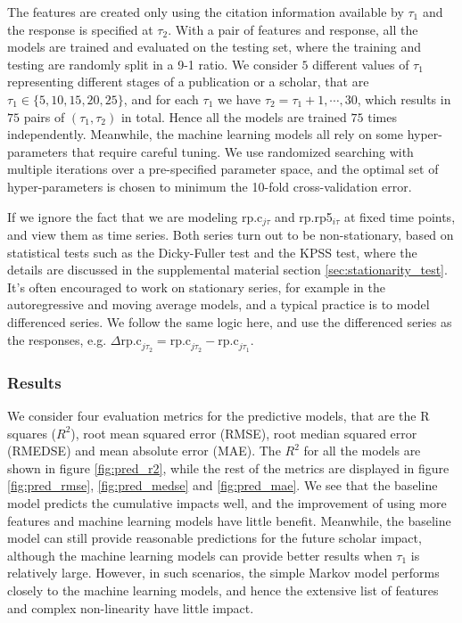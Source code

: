 The features are created only using the citation information available by $\tau_1$ and the response is specified at $\tau_2$. With a pair of features and response, all the models are trained and evaluated on the testing set, where the training and testing are randomly split in a 9-1 ratio. We consider $5$ different values of $\tau_1$ representing different stages of a publication or a scholar, that are $\tau_1\in\{5,10,15,20,25\}$, and for each $\tau_1$ we have $\tau_2=\tau_1+1,\cdots,30$, which results in $75$ pairs of $(\tau_1,\tau_2)$ in total. Hence all the models are trained $75$ times independently. Meanwhile, the machine learning models all rely on some hyper-parameters that require careful tuning. We use randomized searching with multiple iterations over a pre-specified parameter space, and the optimal set of hyper-parameters is chosen to minimum the 10-fold cross-validation error.

If we ignore the fact that we are modeling rp.c$_{j\tau}$ and rp.rp5$_{i\tau}$ at fixed time points, and view them as time series. Both series turn out to be non-stationary, based on statistical tests such as the Dicky-Fuller test\supercite{dickey1979distribution} and the KPSS test\supercite{kwiatkowski1992testing}, where the details are discussed in the supplemental material section \ref{sec:stationarity_test}. It's often encouraged to work on stationary series, for example in the autoregressive and moving average models, and a typical practice is to model differenced series. We follow the same logic here, and use the differenced series as the responses, e.g. $\Delta \text{rp.c}_{j\tau_2} = \text{rp.c}_{j\tau_2} - \text{rp.c}_{j\tau_1}$. 

\subsubsection*{Results}
We consider four evaluation metrics for the predictive models, that are the R squares ($R^2$), root mean squared error (RMSE), root median squared error (RMEDSE) and mean absolute error (MAE). The $R^2$ for all the models are shown in figure \ref{fig:pred_r2}, while the rest of the metrics are displayed in figure \ref{fig:pred_rmse}, \ref{fig:pred_medse} and \ref{fig:pred_mae}. We see that the baseline model predicts the cumulative impacts well, and the improvement of using more features and machine learning models have little benefit. Meanwhile, the baseline model can still provide reasonable predictions for the future scholar impact, although the machine learning models can provide better results when $\tau_1$ is relatively large. However, in such scenarios, the simple Markov model performs closely to the machine learning models, and hence the extensive list of features and complex non-linearity have little impact.





